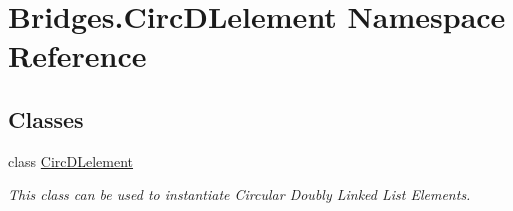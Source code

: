 \hypertarget{namespace_bridges_1_1_circ_d_lelement}{}\section{Bridges.\+Circ\+D\+Lelement Namespace Reference}
\label{namespace_bridges_1_1_circ_d_lelement}
\subsection*{Classes}
\begin{DoxyCompactItemize}
\item 
class \mbox{\hyperlink{class_bridges_1_1_circ_d_lelement_1_1_circ_d_lelement}{Circ\+D\+Lelement}}
\begin{DoxyCompactList}\small\item\em This class can be used to instantiate Circular Doubly Linked List Elements. \end{DoxyCompactList}\end{DoxyCompactItemize}
